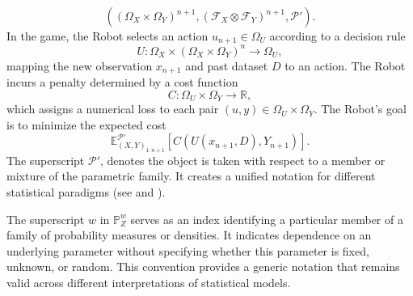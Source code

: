 \begin{definition}
	\begin{equation}
		((\Omega_X \times \Omega_Y)^{n+1}, (\mathcal{F}_X \otimes \mathcal{F}_Y)^{n+1}, \mathcal{P}').
	\end{equation}
	In the game, the Robot selects an action $u_{n+1} \in \Omega_U$ according to a decision rule
	\begin{equation}
		U \colon \Omega_X \times (\Omega_X \times \Omega_Y)^n \to \Omega_U,
	\end{equation}
	mapping the new observation $x_{n+1}$ and past dataset $D$ to an action. The Robot incurs a penalty determined by a cost function
	\begin{equation}
		C \colon \Omega_U \times \Omega_Y \to \mathbb{R},
	\end{equation}
	which assigns a numerical loss to each pair $(u,y) \in \Omega_U \times \Omega_Y$. The Robot's goal is to minimize the expected cost~\cite{murphy2023probabilistic}
	\begin{equation}
		\mathbb{E}_{(X,Y)_{1\colon n+1}}^{\mathcal{P}'}[C(U(x_{n+1},D), Y_{n+1})].
		\label{eq:expcost}
	\end{equation}
	The superscript $\mathcal{P}'$, denotes the object is taken with respect to a member or mixture of the parametric family. It creates a unified notation for different statistical paradigms (see  and ).
\end{definition}

\begin{remark}
	\label{rem:superscript_w}
	The superscript $w$ in $\mathbb{P}_Z^w$ serves as an index identifying a particular member of a family of probability measures or densities. It indicates dependence on an underlying parameter without specifying whether this parameter is fixed, unknown, or random. This convention provides a generic notation that remains valid across different interpretations of statistical models.
\end{remark}


